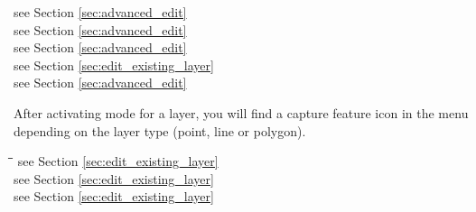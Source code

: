 \begin{itemize}
\begin{tabbing}
        \>
        \> see Section \ref{sec:advanced_edit}
        \>  \\
        \>
        \> see Section \ref{sec:advanced_edit}
        \>  \\
        \>
        \> see Section \ref{sec:advanced_edit}
        \>  \\
        \>
        \> see Section \ref{sec:edit_existing_layer}
        \>  \\
        \>
        \> see Section \ref{sec:advanced_edit}
        \>  \\
\end{tabbing}

After activating  mode
for a layer, you will find a capture feature icon in the 
menu depending on the layer type (point, line or polygon). \\

\begin{tabbing}
\hspace{4.5cm}\=\hspace{3cm}\=\hspace{3.5cm}\= \kill
{}
        \>
        \> see Section \ref{sec:edit_existing_layer}
        \>  \\
        \>
        \> see Section \ref{sec:edit_existing_layer}
        \>  \\
        \>
        \> see Section \ref{sec:edit_existing_layer}
        \>  \\
\end{tabbing}



\end{itemize}
